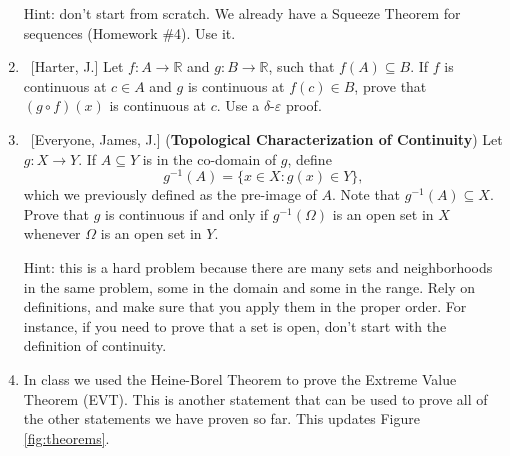 \documentclass[10pt]{article}
\theoremstyle{definition}
\begin{document}
\begin{enumerate}
Hint: don't start from scratch.  We already have a Squeeze Theorem for sequences (Homework \#4).  Use it.

	
\item  ~[Harter, J.] Let $f: A \to \mathbb{R}$ and $g: B \to \mathbb{R}$, such that $f(A) \subseteq B$.  If $f$ is continuous at $c \in A$ and $g$ is continuous at $f(c) \in B$, prove that $(g \circ f)(x)$ is continuous at $c$.  Use a $\delta$-$\varepsilon$ proof.
	
	
\item  ~[Everyone, James, J.] (\textbf{Topological Characterization of Continuity})  Let $g: X \to Y$.  If $A \subseteq Y$ is in the co-domain of $g$, define $$g^{-1}(A) = \{x \in X: g(x) \in Y \},$$ which we previously defined as the pre-image of $A$.  Note that $g^{-1}(A) \subseteq X$. Prove that $g$ is continuous if and only if $g^{-1}(\Omega)$ is an open set in $X$ whenever $\Omega$ is an open set in $Y$.

Hint: this is a hard problem because there are many sets and neighborhoods in the same problem, some in the domain and some in the range.  Rely on definitions, and make sure that you apply them in the proper order.  For instance, if you need to prove that a set is open, don't start with the definition of continuity.
	

\item  In class we used the Heine-Borel Theorem to prove the Extreme Value Theorem (EVT).  This is another statement that can be used to prove all of the other statements we have proven so far.  This updates Figure \ref{fig:theorems}.

	\begin{figure}[h]
	\begin{center}
\end{center}
\end{figure}
\end{enumerate}
\end{document}
